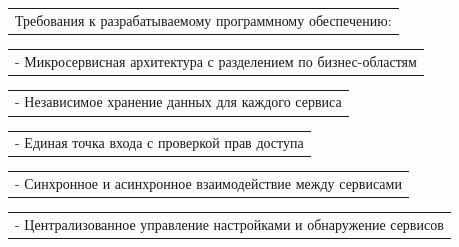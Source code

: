 \documentclass[12pt, А4, twoside]{article}
\begin{document}
\begin{FlushLeft}
    \begin{tabular}{p{17.25cm}}
        \hspace{0.3cm} \textsf{Требования к разрабатываемому программному обеспечению:} \vspace{0pt} \hline \\
    \end{tabular}

    \vspace{-0.1 cm}

    \begin{tabular}{p{17.25cm}}
        \hspace{0.6cm} \textsf{- Микросервисная архитектура с разделением по бизнес-областям}\vspace{0pt} \hline \\
    \end{tabular}

    \vspace{-0.1 cm}

    \begin{tabular}{p{17.25cm}}
        \hspace{0.6cm} \textsf{- Независимое хранение данных для каждого сервиса}\vspace{0pt} \hline \\
    \end{tabular}

    \vspace{-0.1 cm}

    \begin{tabular}{p{17.25cm}}
        \hspace{0.6cm} \textsf{- Единая точка входа с проверкой прав доступа}\vspace{0pt} \hline \\
    \end{tabular}

    \vspace{-0.1 cm}

    \begin{tabular}{p{17.25cm}}
        \hspace{0.6cm} \textsf{- Синхронное и асинхронное взаимодействие между сервисами}\vspace{0pt} \hline \\
    \end{tabular}

    \vspace{-0.1 cm}

    \begin{tabular}{p{17.25cm}}
        \hspace{0.6cm} \textsf{- Централизованное управление настройками и обнаружение сервисов}\vspace{0pt} \hline \\
    \end{tabular}


\end{FlushLeft}
\end{document}
